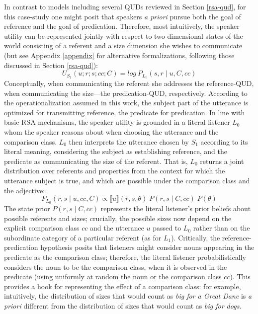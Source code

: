 In contrast to models including several QUDs reviewed in Section \ref{rsa-qud}, for this case-study one might posit that speakers \emph{a priori} pursue both the goal of reference and the goal of predication. Therefore, most intuitively, the speaker utility can be represented jointly with respect to two-dimensional states of the world consisting of a referent and a size dimension she wishes to communicate (but see Appendix \ref{appendix} for alternative formalizations, following those discussed in Section \ref{rsa-qud}): 
\begin{equation}
\label{model1}
U_{S_1} (u; r; s; cc; C) = log \: P_{L_0} (s, r \mid u, C, cc) 
\end{equation}
Conceptually, when communicating the referent she addresses the reference-QUD, when communicating the size---the predication-QUD, respectively. According to the operationalization assumed in this work, the subject part of the utterance is optimized for transmitting reference, the predicate for predication.
In line with basic RSA mechanisms, the speaker utility is grounded in a literal listener $L_0$ whom the speaker reasons about when choosing the utterance and the comparison class. 
$L_0$ then interprets the utterance chosen by $S_1$ according to its literal meaning, considering the subject as establishing reference, and the predicate as communicating the size of the referent. 
That is, $L_0$ returns a joint distribution over referents and properties from the context for which the utterance subject is true, and which are possible under the comparison class and the adjective: %
\begin{equation}
P_{L_0} (r, s \mid u, cc, C) \propto \llbracket u \rrbracket (r, s, \theta)  \;  P(r, s \mid C, cc) \; P(\theta)
\end{equation}
The state prior $P(r, s \mid C, cc)$ represents the literal listener's prior beliefs about possible referents and sizes; crucially, the possible sizes now depend on the explicit comparison class $cc$ and the utterance $u$ passed to $L_0$ rather than on the subordinate category of a particular referent (as for $L_1$). Critically, the reference-predication hypothesis posits that listeners might consider nouns appearing in the predicate as the comparison class; therefore, the literal listener probabilistically considers the noun to be the comparison class, when it is observed in the predicate (using uniformly at random the noun or the comparison class $cc$). This provides a hook for representing the effect of a comparison class: for example, intuitively, the distribution of sizes that would count as \emph{big for a Great Dane} is \emph{a priori} different from the distribution of sizes that would count as \emph{big for dogs}. 
